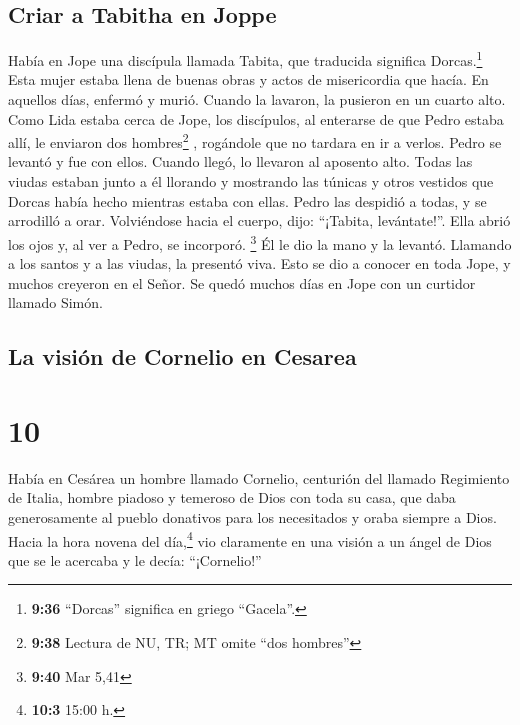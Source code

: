 \hypertarget{criar-a-tabitha-en-joppe}{%
\subsection{Criar a Tabitha en Joppe}\label{criar-a-tabitha-en-joppe}}

 Había en Jope una discípula llamada Tabita, que
traducida significa Dorcas.\footnote{\textbf{9:36} ``Dorcas'' significa
  en griego ``Gacela''.} Esta mujer estaba llena de buenas obras y actos
de misericordia que hacía.  En aquellos días, enfermó y
murió. Cuando la lavaron, la pusieron en un cuarto alto. 
Como Lida estaba cerca de Jope, los discípulos, al enterarse de que
Pedro estaba allí, le enviaron dos hombres\footnote{\textbf{9:38}
  Lectura de NU, TR; MT omite ``dos hombres''} , rogándole que no
tardara en ir a verlos.  Pedro se levantó y fue con
ellos. Cuando llegó, lo llevaron al aposento alto. Todas las viudas
estaban junto a él llorando y mostrando las túnicas y otros vestidos que
Dorcas había hecho mientras estaba con ellas.  Pedro las
despidió a todas, y se arrodilló a orar. Volviéndose hacia el cuerpo,
dijo: ``¡Tabita, levántate!''. Ella abrió los ojos y, al ver a Pedro, se
incorporó. \footnote{\textbf{9:40} Mar 5,41}  Él le dio
la mano y la levantó. Llamando a los santos y a las viudas, la presentó
viva.  Esto se dio a conocer en toda Jope, y muchos
creyeron en el Señor.  Se quedó muchos días en Jope con
un curtidor llamado Simón.

\hypertarget{la-visiuxf3n-de-cornelio-en-cesarea}{%
\subsection{La visión de Cornelio en
Cesarea}\label{la-visiuxf3n-de-cornelio-en-cesarea}}

\hypertarget{section-9}{%
\section{10}\label{section-9}}

 Había en Cesárea un hombre llamado Cornelio, centurión
del llamado Regimiento de Italia,  hombre piadoso y
temeroso de Dios con toda su casa, que daba generosamente al pueblo
donativos para los necesitados y oraba siempre a Dios. 
Hacia la hora novena del día,\footnote{\textbf{10:3} 15:00 h.} vio
claramente en una visión a un ángel de Dios que se le acercaba y le
decía: ``¡Cornelio!''

